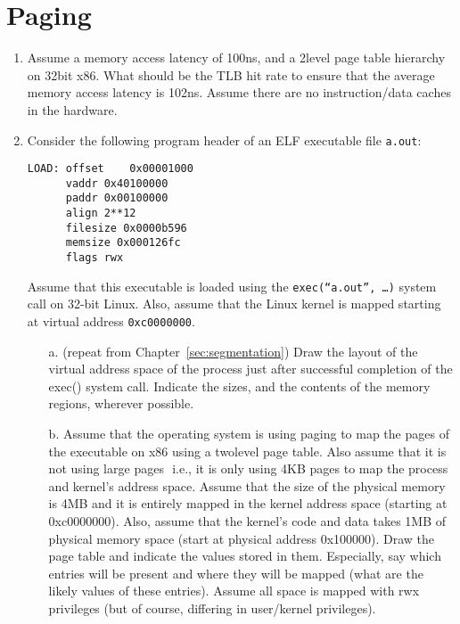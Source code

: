 \section{Paging}
\begin{enumerate}
\item  Assume a memory access latency of 100ns, and a 2­level page table hierarchy on 32­bit
x86. What should be the TLB hit rate to ensure that the average memory access latency is
102ns. Assume there are no instruction/data caches in the hardware.

\item
Consider the following program header of an ELF executable file {\tt a.out}:
\begin{verbatim}
LOAD: offset    0x00001000
      vaddr 0x40100000
      paddr 0x00100000
      align 2**12
      filesize 0x0000b596
      memsize 0x000126fc
      flags rwx
\end{verbatim}
Assume that this executable is loaded using the {\tt exec(“a.out”, …)} system call on 32-bit Linux.
Also, assume that the Linux kernel is mapped starting at virtual address {\tt 0xc0000000}.
\begin{enumerate}
\item[a.] (repeat from Chapter~\ref{sec:segmentation}) Draw the layout of
the virtual address space of the process just after successful completion of
the exec() system call. Indicate the sizes, and the contents of the memory regions, wherever possible.
\item[b.] Assume that the operating system is using paging to map the pages of the executable on
x86 using a two­level page table. Also assume that it is not using large pages ­­­ i.e., it is only
using 4KB pages to map the process and kernel’s address space. Assume that the size of the
physical memory is 4MB and it is entirely mapped in the kernel address space (starting at
0xc0000000). Also, assume that the kernel’s code and data takes 1MB of physical memory
space (start at physical address 0x100000). Draw the page table and indicate the values stored
in them. Especially, say which entries will be present and where they will be mapped (what are
the likely values of these entries). Assume all space is mapped with rwx privileges (but of
course, differing in user/kernel privileges).
\end{enumerate}


\end{enumerate}
